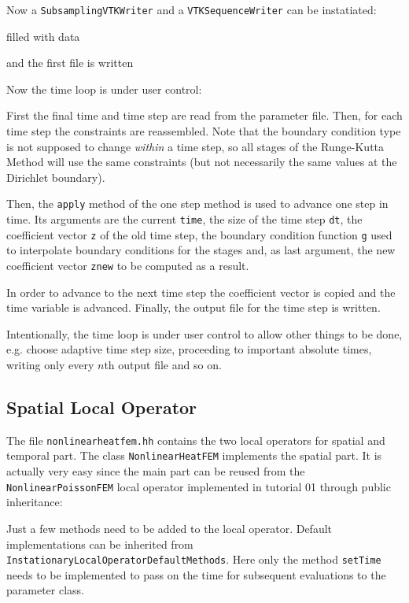 \documentclass[a4paper,12pt]{article}
\begin{document}
Now a \lstinline{SubsamplingVTKWriter} and a \lstinline{VTKSequenceWriter}
can be instatiated:

filled with data

and the first file is written


Now the time loop is under user control:

First the final time and time step are read from the parameter
file. Then, for each time step the constraints are reassembled. Note that
the boundary condition type is not supposed to
change \textit{within} a time step, so all stages of the Runge-Kutta Method
will use the same constraints (but not necessarily the same values at the
Dirichlet boundary).

Then, the \lstinline{apply} method of the one step method is used to
advance one step in time. Its arguments are the current \lstinline{time}, the
size of the time step \lstinline{dt}, the coefficient vector \lstinline{z} of the old
time step, the boundary condition function \lstinline{g} used to interpolate
boundary conditions for the stages and, as last argument, the new coefficient
vector \lstinline{znew} to be computed as a result.

In order to advance to the next time step the coefficient vector is copied and the
time variable is advanced. Finally, the output file for the time step is written.

Intentionally, the time loop is under user control to allow other things to be done,
e.g. choose adaptive time step size, proceeding to important absolute times,
writing only  every $n$th output file and so on.

\subsection{Spatial Local Operator}

The file \lstinline{nonlinearheatfem.hh} contains the two local operators
for spatial and temporal part. The class \lstinline{NonlinearHeatFEM} implements the
spatial part. It is actually very easy since the main part can be reused
from the \lstinline{NonlinearPoissonFEM} local operator  implemented in tutorial 01 through
public inheritance:

Just a few methods need to be added to the local operator.
Default implementations can be inherited from
\lstinline{InstationaryLocalOperatorDefaultMethods}. Here only the method
\lstinline{setTime} needs to be implemented to pass on the time
for subsequent evaluations to the parameter class.
\end{document}
